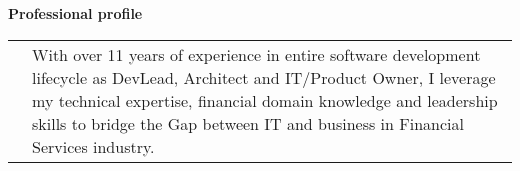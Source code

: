 \textbf{Professional profile}
\\
\begin{tabular}{p{}|p{}}
&With over 11 years of experience in entire software development lifecycle as DevLead, Architect and IT/Product Owner, I leverage my technical expertise, financial domain knowledge and leadership skills to bridge the Gap between IT and business in Financial Services industry.\\
\end{tabular}
